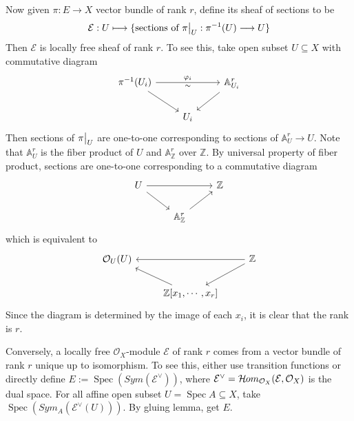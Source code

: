 \documentclass{ctexart}
\newcommand{\sheafhom}{\mathcal{H}\kern -.5pt om}
\newcommand{\spec}{\operatorname{Spec}}
\begin{document}
Now given $\pi: E \longrightarrow X$ vector bundle of rank $r$,
define its sheaf of sections to be 
\begin{equation}
    \mathcal{E}: U \longmapsto \{\text{sections of } \pi\big{|}_{U}: \pi^{-1}(U) \longrightarrow U\}
\end{equation}
Then $\mathcal{E}$ is locally free sheaf of rank $r$.
To see this, take open subset $U \subseteq X$ with commutative diagram 
\begin{equation*}
    \begin{tikzcd}
        \pi^{-1}(U_{i}) \arrow[rr, "\varphi_{i}", "\sim" swap] \arrow[dr] &&
        \mathbb{A}_{U_{i}}^{r} \arrow[dl] \\
        & U_{i} &
    \end{tikzcd}
\end{equation*}
Then sections of $\pi\big{|}_{U}$ are one-to-one corresponding to sections of $\mathbb{A}_{U}^{r} \longrightarrow U$.
Note that $\mathbb{A}_{U}^{r}$ is the fiber product of $U$ and $\mathbb{A}_{\mathbb{Z}}^{r}$ over $\mathbb{Z}$.
By universal property of fiber product, sections are one-to-one corresponding to a commutative diagram
\begin{equation*}
    \begin{tikzcd}
        U \arrow[rr] \arrow[dr] &&
        \mathbb{Z} \\
        & \mathbb{A}_{\mathbb{Z}}^{r} \arrow[ur] &
    \end{tikzcd}
\end{equation*}
which is equivalent to 
\begin{equation*}
    \begin{tikzcd}
        \mathcal{O}_{U}(U) &&
        \mathbb{Z} \arrow[dl] \arrow[ll] \\
        & \mathbb{Z}[x_{1}, \cdots, x_{r}] \arrow[ul] &
    \end{tikzcd}
\end{equation*}
Since the diagram is determined by the image of each $x_{i}$, it is clear that the rank is $r$.
\par
Conversely, a locally free $\mathcal{O}_{X}$-module $\mathcal{E}$ of rank $r$ comes from a vector bundle of rank $r$ unique up to isomorphism.
To see this, either use transition functions or directly define $E := \spec(Sym(\mathcal{E}^{\lor}))$, where $\mathcal{E}^{\lor} = \sheafhom_{\mathcal{O}_{X}}(\mathcal{E}, \mathcal{O}_{X})$ is the dual space.
For all affine open subset $U = \spec A \subseteq X$, take $\spec(Sym_{A}(\mathcal{E}^{\lor}(U)))$.
By gluing lemma, get $E$.
\end{document}
